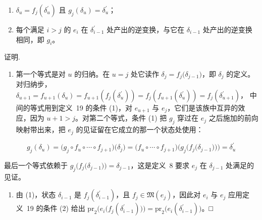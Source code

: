 \documentclass[
  10
]{article}
\providecommand{\tightlist}{%
  \setlength{\itemsep}{0pt}\setlength{\parskip}{0pt}}
\begin{document}
\begin{enumerate}
\def\labelenumi{\arabic{enumi}.}
\item
  \(\delta _ { u } = f _ { j } ( \delta _ { u } ^ { \prime } )\) 且
  \(g _ { j } ( \delta _ { u } ) = \delta _ { u } ^ { \prime }\)；
\item
  每个满足 \(i > j\) 的 \(e _ { i }\) 在 \(\delta _ { i - 1 } ^ { \prime }\) 处产出的逆变换，与它在
  \(\delta _ { i - 1 }\) 处产出的逆变换相同，即 \(g _ { i }\)。
\end{enumerate}

证明.

\begin{enumerate}
\def\labelenumi{\arabic{enumi}.}
\tightlist
\item
  第一个等式是对 \(u\) 的归纳。在 \(u = j\) 处它读作
  \(\delta _ { j } = f _ { j } \big ( \delta _ { j - 1 } \big )\)，即 \(\delta _ { j }\) 的定义。对归纳步，
  \(\delta _ { u + 1 } = f _ { u + 1 } ( \delta _ { u } ) = f _ { u + 1 } ( f _ { j } ( \delta _ { u } ^ { \prime } ) ) = f _ { j } ( f _ { u + 1 } ( \delta _ { u } ^ { \prime } ) ) = f _ { j } \left( \delta _ { u + 1 } ^ { \prime } \right)\)，
  中间的等式用到定义~19 的条件 (1)，对 \(e _ { u + 1 }\) 与 \(e _ { j }\)，它们是该族中互异的效应，因为 \(u + 1 > j\)。对第二个等式，条件 (1) 把 \(g _ { j }\) 穿过在 \(e _ { j }\) 之后施加的前向映射带出来，把 \(e _ { j }\) 的见证留在它成立的那一个状态处使用：
\end{enumerate}

\[
g _ { j } ( \delta _ { u } ) = \bigl ( g _ { j } \circ f _ { u } \circ \cdots \circ f _ { j + 1 } \bigr ) \bigl ( \delta _ { j } \bigr ) = \bigl ( f _ { u } \circ \cdots \circ f _ { j + 1 } \bigr ) \bigl ( g _ { j } \bigl ( f _ { j } \bigl ( \delta _ { j - 1 } \bigr ) \bigr ) \bigr ) = \delta _ { u } ^ { \prime }
\]

最后一个等式依赖于
\(g _ { j } \big ( f _ { j } \big ( \delta _ { j - 1 } \big ) \big ) = \delta _ { j - 1 }\)，这是定义~8 要求 \(e _ { j }\) 在
\(\delta _ { j - 1 }\) 处满足的见证。

\begin{enumerate}
\def\labelenumi{\arabic{enumi}.}
\setcounter{enumi}{1}
\tightlist
\item
  由 (1)，状态 \(\delta _ { i - 1 }\) 是 \(f _ { j } ( \delta _ { i - 1 } ^ { \prime } )\)，且
  \(f _ { j } \in \mathfrak { M } ( e _ { j } )\)，因此对 \(e _ { i }\) 与 \(e _ { j }\) 应用定义~19 的条件 (2) 给出
  \(\mathrm { p r } _ { 2 } \big ( e _ { i } \big ( f _ { j } ( \delta _ { i - 1 } ^ { \prime } ) \big ) \big ) = \mathrm { p r } _ { 2 } \big ( e _ { i } ( \delta _ { i - 1 } ^ { \prime } ) \big )\)。□
\end{enumerate}
\end{document}
